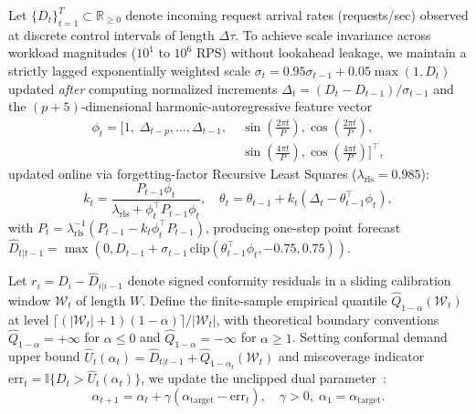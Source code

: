 \documentclass[journal]{IEEEtran}
\begin{document}
Let $\{D_t\}_{t=1}^T \subset \mathbb{R}_{\ge 0}$ denote incoming request arrival rates (requests/sec) observed at discrete control intervals of length $\Delta\tau$. To achieve scale invariance across workload magnitudes ($10^1$ to $10^6$ RPS) without lookahead leakage, we maintain a strictly lagged exponentially weighted scale $\sigma_t = 0.95\sigma_{t-1} + 0.05\max(1, D_t)$ updated \emph{after} computing normalized increments $\Delta_t = (D_t - D_{t-1})/\sigma_{t-1}$ and the $(p+5)$-dimensional harmonic-autoregressive feature vector
\begin{equation}
\begin{aligned}
    \phi_t = \Big[1, \; \Delta_{t-p}, \dots, \Delta_{t-1}, \; &\sin\!\left(\tfrac{2\pi t}{P}\right), \cos\!\left(\tfrac{2\pi t}{P}\right), \\
    &\sin\!\left(\tfrac{4\pi t}{P}\right), \cos\!\left(\tfrac{4\pi t}{P}\right)\Big]^\top,
\end{aligned}
\end{equation}
updated online via forgetting-factor Recursive Least Squares ($\lambda_{\mathrm{rls}} = 0.985$):
\begin{equation}
    k_t = \frac{P_{t-1}\phi_t}{\lambda_{\mathrm{rls}} + \phi_t^\top P_{t-1}\phi_t}, \quad
    \theta_t = \theta_{t-1} + k_t(\Delta_t - \theta_{t-1}^\top\phi_t),
\end{equation}
with $P_t = \lambda_{\mathrm{rls}}^{-1}(P_{t-1} - k_t\phi_t^\top P_{t-1})$, producing one-step point forecast $\hat{D}_{t|t-1} = \max(0, D_{t-1} + \sigma_{t-1}\,\mathrm{clip}(\theta_{t-1}^\top \phi_t, -0.75, 0.75))$.

Let $r_i = D_i - \hat{D}_{i|i-1}$ denote signed conformity residuals in a sliding calibration window $\mathcal{W}_t$ of length $W$. Define the finite-sample empirical quantile $\hat{Q}_{1-\alpha}(\mathcal{W}_t)$ at level $\lceil(|\mathcal{W}_t|+1)(1-\alpha)\rceil / |\mathcal{W}_t|$, with theoretical boundary conventions $\hat{Q}_{1-\alpha} = +\infty$ for $\alpha \le 0$ and $\hat{Q}_{1-\alpha} = -\infty$ for $\alpha \ge 1$. Setting conformal demand upper bound $\hat{U}_t(\alpha_t) = \hat{D}_{t|t-1} + \hat{Q}_{1-\alpha_t}(\mathcal{W}_t)$ and miscoverage indicator $\mathrm{err}_t = \mathbb{I}\{D_t > \hat{U}_t(\alpha_t)\}$, we update the unclipped dual parameter~\cite{gibbs2021adaptive}:
\begin{equation}\label{eq:aci}
    \alpha_{t+1} = \alpha_t + \gamma(\alpha_{\mathrm{target}} - \mathrm{err}_t), \quad \gamma > 0, \; \alpha_1 = \alpha_{\mathrm{target}}.
\end{equation}
\end{document}
